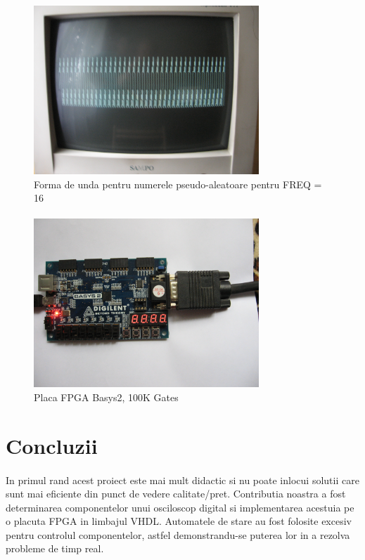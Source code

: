 \documentclass[10pt,a4paper]{article}
\begin{document}
\begin{figure}[h]
\centering
\includegraphics[width=240pt]{waveform2}
\caption{Forma de unda pentru numerele pseudo-aleatoare pentru FREQ = 16}
\label{fig:waveform2}
\end{figure}

\clearpage

\paragraph{}
\begin{figure}[h]
\centering
\includegraphics[width=240pt]{board}
\caption{Placa FPGA Basys2, 100K Gates}
\label{fig:board}
\end{figure}



\section{Concluzii}
\paragraph{}
In primul rand acest proiect este mai mult didactic si nu poate inlocui solutii care sunt mai eficiente din punct de vedere calitate/pret. Contributia noastra a fost determinarea componentelor unui osciloscop digital si implementarea acestuia pe o placuta FPGA in limbajul VHDL. Automatele de stare au fost folosite excesiv pentru controlul componentelor, astfel demonstrandu-se puterea lor in a rezolva probleme de timp real.
\end{document}
